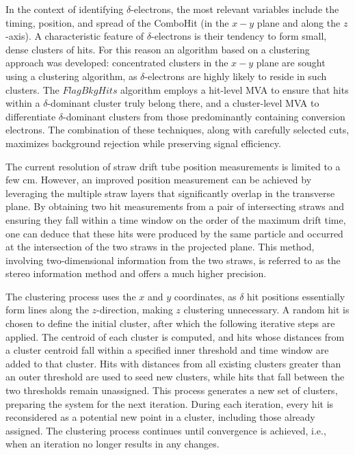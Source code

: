 In the context of identifying $\delta$-electrons, the most relevant variables include 
the timing, position, and spread of the ComboHit (in the $x-y$ plane and along the 
$z$-axis). A characteristic feature of $\delta$-electrons is their tendency to form small, 
dense clusters of hits. For this reason an algorithm based 
on a clustering approach was developed: concentrated clusters in the $x-y$ plane are sought using a 
clustering algorithm, as $\delta$-electrons are highly likely to reside in such clusters. 
The $FlagBkgHits$ algorithm employs a hit-level MVA to ensure that hits within a 
$\delta$-dominant cluster truly belong there, and a cluster-level MVA to differentiate 
$\delta$-dominant clusters from those predominantly containing conversion electrons. 
The combination of these techniques, along with carefully selected cuts, maximizes 
background rejection while preserving signal efficiency.

The current resolution of straw drift tube position measurements is limited to a few 
cm. However, an improved position measurement can be achieved by leveraging the 
multiple straw layers that significantly overlap in the transverse plane. By 
obtaining two hit measurements from a pair of intersecting straws and ensuring 
they fall within a time window on the order of the maximum drift time, one can 
deduce that these hits were produced by the same particle and occurred at the 
intersection of the two straws in the projected plane. This method, involving 
two-dimensional information from the two straws, is referred to as the stereo 
information method and offers a much higher precision.

The clustering process uses the $x$ and $y$ coordinates, as $\delta$ hit positions 
essentially form lines along the $z$-direction, making $z$ clustering unnecessary. 
A random hit is chosen to define the initial cluster, after which the following 
iterative steps are applied. The centroid of each cluster is computed, and hits 
whose distances from a cluster centroid fall within a specified inner threshold 
and time window are added to that cluster. Hits with distances from all existing 
clusters greater than an outer threshold are used to seed new clusters, while hits 
that fall between the two thresholds remain unassigned. This process generates a 
new set of clusters, preparing the system for the next iteration. During each iteration, 
every hit is reconsidered as a potential new point in a cluster, including those already 
assigned. The clustering process continues until convergence is achieved, i.e., 
when an iteration no longer results in any changes. 

